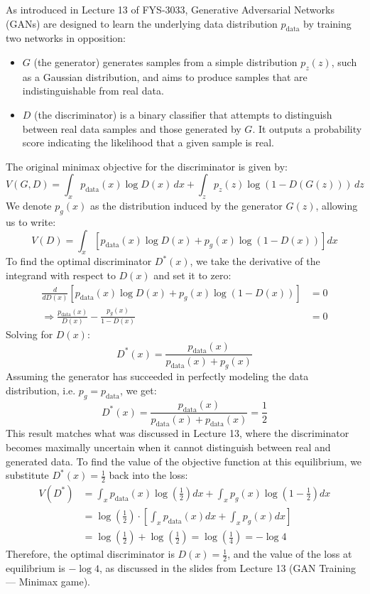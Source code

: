 \documentclass[10pt]{article}
\begin{document}
As introduced in Lecture 13 of FYS-3033, Generative Adversarial Networks (GANs) are designed to learn the underlying data distribution \( p_{\text{data}} \) by training two networks in opposition: 
\begin{itemize}
\item \( G \) (the generator) generates samples from a simple distribution \( p_z(z) \), such as a Gaussian distribution, and aims to produce samples that are indistinguishable from real data.
\item \( D \) (the discriminator) is a binary classifier that attempts to distinguish between real data samples and those generated by \( G \). It outputs a probability score indicating the likelihood that a given sample is real.
\end{itemize}
The original minimax objective for the discriminator is given by:
\[
V(G, D) = \int_x p_{\text{data}}(x) \log D(x) \, dx + \int_z p_z(z) \log(1 - D(G(z))) \, dz
\]
We denote \( p_g(x) \) as the distribution induced by the generator \( G(z) \), allowing us to write:
\[
V(D) = \int_x \left[ p_{\text{data}}(x) \log D(x) + p_g(x) \log(1 - D(x)) \right] dx
\]
To find the optimal discriminator \( D^*(x) \), we take the derivative of the integrand with respect to \( D(x) \) and set it to zero:
\begin{align*}
\frac{d}{dD(x)} \left[ p_{\text{data}}(x) \log D(x) + p_g(x) \log(1 - D(x)) \right] &= 0 \\
\Rightarrow \frac{p_{\text{data}}(x)}{D(x)} - \frac{p_g(x)}{1 - D(x)} &= 0
\end{align*}
Solving for \( D(x) \):
\[
D^*(x) = \frac{p_{\text{data}}(x)}{p_{\text{data}}(x) + p_g(x)}
\]
Assuming the generator has succeeded in perfectly modeling the data distribution, i.e. \( p_g = p_{\text{data}} \), we get:
\[
D^*(x) = \frac{p_{\text{data}}(x)}{p_{\text{data}}(x) + p_{\text{data}}(x)} = \frac{1}{2}
\]
This result matches what was discussed in Lecture 13, where the discriminator becomes maximally uncertain when it cannot distinguish between real and generated data.
\medskip
To find the value of the objective function at this equilibrium, we substitute \( D^*(x) = \frac{1}{2} \) back into the loss:
\begin{align*}
V(D^*) &= \int_x p_{\text{data}}(x) \log \left( \frac{1}{2} \right) dx + \int_x p_g(x) \log \left( 1 - \frac{1}{2} \right) dx \\
&= \log \left( \frac{1}{2} \right) \cdot \left[ \int_x p_{\text{data}}(x) dx + \int_x p_g(x) dx \right] \\
&= \log \left( \frac{1}{2} \right) + \log \left( \frac{1}{2} \right) = \log \left( \frac{1}{4} \right) = -\log 4
\end{align*}
Therefore, the optimal discriminator is \( \boxed{D(x) = \frac{1}{2}} \), and the value of the loss at equilibrium is \( \boxed{-\log 4} \), as discussed in the slides from Lecture 13 (GAN Training — Minimax game).
\end{document}

